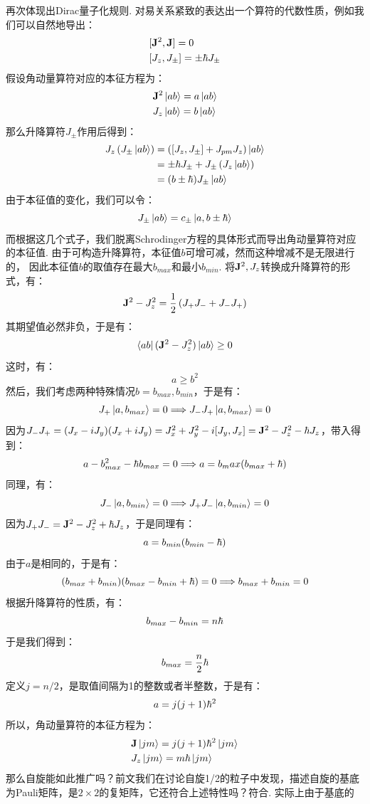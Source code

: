 再次体现出Dirac量子化规则. 对易关系紧致的表达出一个算符的代数性质，例如我们可以自然地导出：
\begin{align*}
& [\mathbf{J}^{2},\mathbf{J}] = 0 \\
& [J_{z},J_{\pm}] = \pm\hbar J_{\pm}
\end{align*}
假设角动量算符对应的本征方程为：
\begin{align*}
& \mathbf{J}^{2}\ket{ab} = a\ket{ab} \\
& J_{z}\ket{ab} = b\ket{ab}
\end{align*}
那么升降算符\(J_{\pm}\)作用后得到：
\begin{align*}
J_{z}\left({J_{\pm}\ket{ab}}\right) 
& = \left({[J_{z},J_{\pm}] + J_{pm}J_{z}}\right)\ket{ab} \\
& = \pm\hbar J_{\pm} + J_{\pm}\left({J_{z}\ket{ab}}\right) \\
& = (b\pm \hbar)J_{\pm}\ket{ab}
\end{align*}
由于本征值的变化，我们可以令：
\[
J_{\pm}\ket{ab} = c_{\pm}\ket{a,b\pm\hbar}
\]
而根据这几个式子，我们脱离Schrodinger方程的具体形式而导出角动量算符对应的本征值. 由于可构造升降算符，本征值\(b\)可增可减，然而这种增减不是无限进行的，
因此本征值\(b\)的取值存在最大\(b_{max}\)和最小\(b_{min}\). 将\(\mathbf{J}^{2},J_{z}\)转换成升降算符的形式，有：
\[
\mathbf{J}^2 - J_{z}^{2} = \frac{1}{2}\left({J_{+}J_{-} + J_{-}J_{+}}\right)
\]
其期望值必然非负，于是有：
\[
\bra{ab}(\mathbf{J}^{2} - J_{z}^{2})\ket{ab} \geq 0 
\]
这时，有：
\[
a \geq b^2
\]
然后，我们考虑两种特殊情况\(b=b_{max},b_{min}\)，于是有：
\[
J_{+}\ket{a,b_{max}} = 0 \Longrightarrow J_{-}J_{+}\ket{a,b_{max}} = 0
\]
因为\(J_{-}J_{+} = (J_{x}-iJ_{y})(J_{x} + iJ_{y}) = J_{x}^{2}+J_{y}^{2} - i[J_{y},J_{x}] = \mathbf{J}^{2} - J_{z}^{2} - \hbar J_{z}\)，带入得到：
\[
a - b_{max}^{2} - \hbar b_{max} = 0 \Longrightarrow a = b_max(b_{max} + \hbar)
\]
同理，有：
\[
J_{-}\ket{a,b_{min}} = 0 \Longrightarrow J_{+}J_{-}\ket{a,b_{min}} = 0
\]
因为\(J_{+}J_{-} = \mathbf{J}^2 - J_{z}^{2} + \hbar J_{z}\)，于是同理有：
\[
a = b_{min}(b_{min} - \hbar)
\]
由于\(a\)是相同的，于是有：
\[
(b_{max} + b_{min})(b_{max}-b_{min} + \hbar) = 0 \Longrightarrow b_{max} + b_{min} = 0
\]
根据升降算符的性质，有：
\[
b_{max} - b_{min} = n\hbar 
\]
于是我们得到：
\[
b_{max} = \frac{n}{2}\hbar
\]
定义\(j = n/2\)，是取值间隔为1的整数或者半整数，于是有：
\[
a = j(j+1)\hbar^2
\]
所以，角动量算符的本征方程为：
\begin{align*}
& \mathbf{J}\ket{jm} = j(j+1)\hbar^2\ket{jm} \\
& J_{z}\ket{jm} = m\hbar\ket{jm}
\end{align*}
那么自旋能如此推广吗？前文我们在讨论自旋1/2的粒子中发现，描述自旋的基底为Pauli矩阵，是\(2\times2\)的复矩阵，它还符合上述特性吗？符合. 实际上由于基底的
